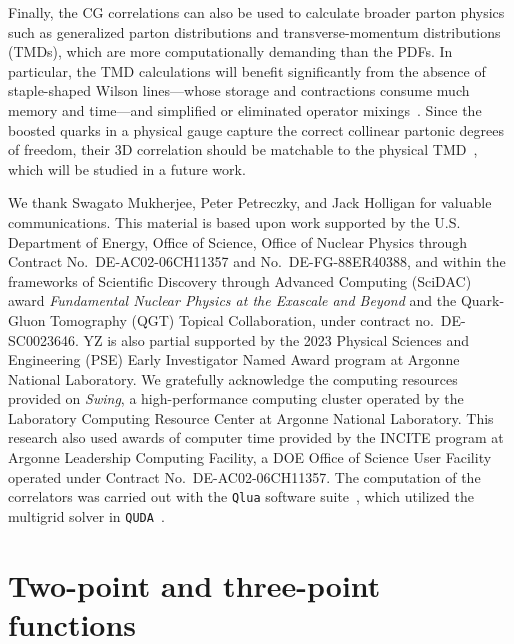 \documentclass[prd,twocolumn,preprintnumbers,showpacs,nofootinbib,superscriptaddress,notitlepage,floatfix]{revtex4-1}
\begin{document}
Finally, the CG correlations can also be used to calculate broader parton physics such as generalized parton distributions and transverse-momentum distributions (TMDs), which are more computationally demanding than the PDFs. In particular, the TMD calculations will benefit significantly from the absence of staple-shaped Wilson lines---whose storage and contractions consume much memory and time---and simplified or eliminated operator mixings~\cite{Constantinou:2019vyb,Shanahan:2019zcq,Green:2020xco,Ji:2021uvr,Alexandrou:2023ucc}. Since the boosted quarks in a physical gauge capture the correct collinear partonic degrees of freedom, their 3D correlation should be matchable to the physical TMD~\cite{Ebert:2018gzl,Ebert:2019okf,Ji:2019sxk,Ji:2019ewn,Ebert:2022fmh}, which will be studied in a future work.


\begin{acknowledgments}

We thank Swagato Mukherjee, Peter Petreczky, and Jack Holligan for valuable communications.
This material is based upon work supported by the U.S. Department of Energy, Office of Science, Office of Nuclear Physics through Contract No.~DE-AC02-06CH11357 and No.~DE-FG-88ER40388, and within the frameworks of Scientific Discovery through Advanced Computing (SciDAC) award \textit{Fundamental Nuclear Physics at the Exascale and Beyond} and the Quark-Gluon Tomography (QGT) Topical Collaboration, under contract no.~DE-SC0023646. 
YZ is also partial supported by the 2023 Physical Sciences and Engineering (PSE) Early Investigator Named Award program at Argonne National Laboratory.
We gratefully acknowledge the computing resources provided on \textit{Swing}, a high-performance computing cluster operated by the Laboratory Computing Resource Center at Argonne National Laboratory.
This research also used awards of computer time provided by the INCITE program at Argonne Leadership Computing Facility, a DOE Office of Science User Facility operated under Contract No.~DE-AC02-06CH11357. 
The computation of the correlators was carried out with the \texttt{Qlua} software suite~\cite{qlua}, which utilized the multigrid solver in \texttt{QUDA}~\cite{Clark:2009wm,Babich:2011np}.

\end{acknowledgments}


\appendix

\section{Two-point and three-point functions}\label{app:bare}
\end{document}
